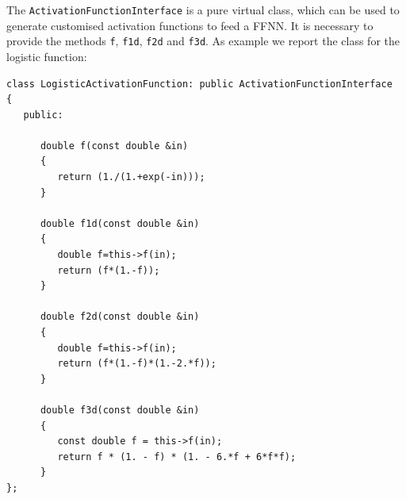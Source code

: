 \documentclass[11pt,a4paper,twoside]{article}
\begin{document}
The \verb+ActivationFunctionInterface+ is a pure virtual class, which can be used to generate customised activation functions to feed a FFNN.
It is necessary to provide the methods \verb+f+, \verb+f1d+, \verb+f2d+ and \verb+f3d+.
As example we report the class for the logistic function:

\begin{verbatim}
class LogisticActivationFunction: public ActivationFunctionInterface
{
   public:

      double f(const double &in)
      {
         return (1./(1.+exp(-in)));
      }

      double f1d(const double &in)
      {
         double f=this->f(in);
         return (f*(1.-f));
      }

      double f2d(const double &in)
      {
         double f=this->f(in);
         return (f*(1.-f)*(1.-2.*f));
      }

      double f3d(const double &in)
      {
         const double f = this->f(in);
         return f * (1. - f) * (1. - 6.*f + 6*f*f);
      }
};

\end{verbatim}






\printindex
\end{document}
